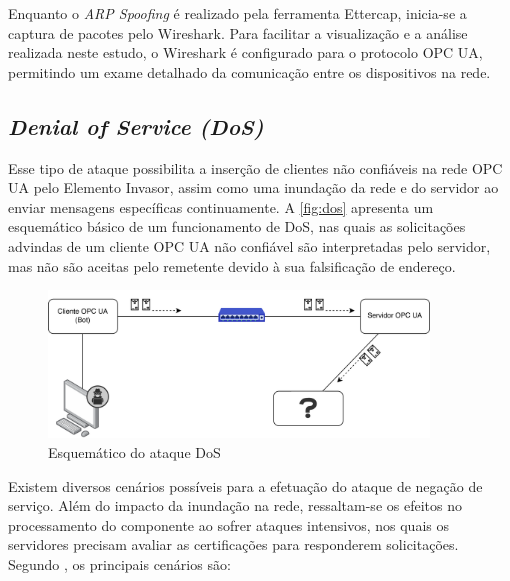     Enquanto o \textit{ARP Spoofing} é realizado pela ferramenta Ettercap, inicia-se a captura de pacotes pelo Wireshark. Para facilitar a visualização e a análise realizada neste estudo, o Wireshark é configurado para o protocolo OPC UA, permitindo um exame detalhado da comunicação entre os dispositivos na rede.
    
    \subsection{\textit{Denial of Service (DoS)}}

    Esse tipo de ataque possibilita a inserção de clientes não confiáveis na rede OPC UA pelo Elemento Invasor, assim como uma inundação da rede e do servidor ao enviar mensagens específicas continuamente. A \autoref{fig:dos} apresenta um esquemático básico de um funcionamento de DoS, nas quais as solicitações advindas de um cliente OPC UA não confiável são interpretadas pelo servidor, mas não são aceitas pelo remetente devido à sua falsificação de endereço.

     \begin{figure}[htbp]
        \caption{\label{fig:dos}Esquemático do ataque DoS}
        \begin{center}
            \includegraphics[width=0.9\textwidth]{USPSC-img/dos.png}
        \end{center}
    \end{figure}
    
    Existem diversos cenários possíveis para a efetuação do ataque de negação de serviço. Além do impacto da inundação na rede, ressaltam-se os efeitos no processamento do componente ao sofrer ataques intensivos, nos quais os servidores precisam avaliar as certificações para responderem solicitações. Segundo , os principais cenários são:

